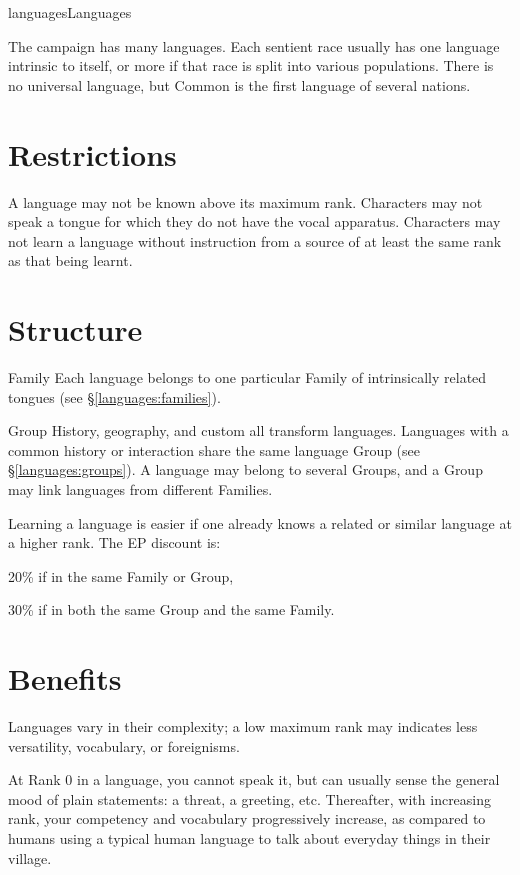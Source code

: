 \begin{Skill}[2.1]{languages}{Languages}

The campaign has many languages.  Each sentient race usually has one
language intrinsic to itself, or more if that race is split into
various populations.  There is no universal language, but Common is
the first language of several nations.

\section{Restrictions}

A language may not be known above its maximum rank. Characters may not
speak a tongue for which they do not have the vocal apparatus.
Characters may not learn a language without instruction from a source
of at least the same rank as that being learnt.

\section{Structure}
Family Each language belongs to one particular Family of intrinsically
related tongues (see \S\ref{languages:families}).

Group History, geography, and custom all transform languages.
Languages with a common history or interaction share the same language
Group (see \S\ref{languages:groups}).  A language may belong to
several Groups, and a Group may link languages from different
Families.

Learning a language is easier if one already knows a related or
similar language at a higher rank. The EP discount is:

\begin{Itemize}

\item 20\% if in the same Family or Group,  

\item 30\% if in both the same Group and the same Family.

\end{Itemize}

\section{Benefits}

Languages vary in their complexity; a low maximum rank may indicates
less versatility, vocabulary, or foreignisms.

At Rank 0 in a language, you cannot speak it, but can usually sense
the general mood of plain statements: a threat, a greeting, etc.
Thereafter, with increasing rank, your competency and vocabulary
progressively increase, as compared to humans using a typical human
language to talk about everyday things in their village.


\end{Skill}

